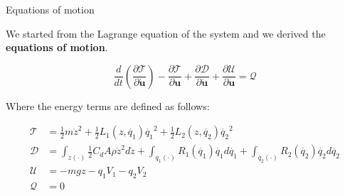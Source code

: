 \begin{frame}{Equations of motion}

    We started from the Lagrange equation of the system and we derived the \textbf{equations of motion}.

    \begin{equation}
        \frac{d}{dt} \left( \frac{\partial \mathcal{T}}{\partial \dot{\mathbf{u}}} \right) - \frac{\partial \mathcal{T}}{\partial \mathbf{u}} + \frac{\partial \mathcal{D}}{\partial \dot{\mathbf{u}}} + \frac{\partial \mathcal{U}}{\partial \mathbf{u}} = \mathcal{Q}
        \label{eq:lagrange_equation}
    \end{equation}

    Where the energy terms are defined as follows:

    \begin{equation}
        \begin{aligned}
            \mathcal{T} & = \frac{1}{2} m \dot{z}^2 + \frac{1}{2} L_1(z, \dot{q_1}) \dot{q_1}^2 + \frac{1}{2} L_2(z, \dot{q_2}) \dot{q_2}^2                                                                             \\
            \mathcal{D} & = \int_{\dot{z}(\cdot)} \frac{1}{2} C_d A \rho \dot{z}^2 d\dot{z} + \int_{\dot{q_1}(\cdot)} R_1(\dot{q_1}) \dot{q_1} d\dot{q_1} + \int_{\dot{q_2}(\cdot)} R_2(\dot{q_2}) \dot{q_2} d\dot{q_2} \\
            \mathcal{U} & = -m g z - q_1 V_1 - q_2 V_2                                                                                                                                                                  \\
            \mathcal{Q} & = 0
        \end{aligned}
    \end{equation}

\end{frame}



